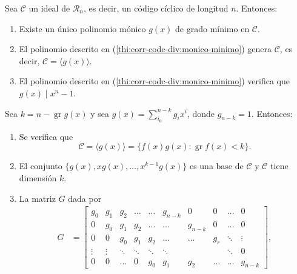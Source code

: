 \begin{theorem}
  \label{th:corr-cod-div}
  Sea \(\mathcal C\) un ideal de \(\mathcal R_n\), es decir, un código cíclico de longitud \(n\). Entonces:
  \begin{enumerate}
    \item Existe un único polinomio mónico \(g(x)\) de grado mínimo en \(\mathcal C\).\label{thi:corr-codc-div:monico-minimo}
    \item El polinomio descrito en (\ref{thi:corr-codc-div:monico-minimo}) genera \(\mathcal C\), es decir, \(\mathcal C = \langle g(x)\rangle\).
    \item El polinomio descrito en (\ref{thi:corr-codc-div:monico-minimo}) verifica que \(g(x) \mid x^n -1\).\label{thi:corr-codc-div:div-xn-1}
  \end{enumerate}
  Sea \(k = n - \operatorname{gr} g(x)\) y sea \(g(x) = \sum_{i_0}^{n-k}g_ix^{i}\), donde \(g_{n-k} = 1\). Entonces:
  \begin{enumerate}[resume]
    \item \label{thi:corr-codc-div:dim-ideal} Se verifica que \[
      \mathcal C = \langle g(x) \rangle = \{f(x)g(x) : \operatorname{gr} f(x) < k\}.
    \]
    \item El conjunto \(\{g(x), xg(x), \dots, x^{k-1}g(x)\}\) es una base de \(\mathcal C\) y \(\mathcal C\) tiene dimensión \(k\).
    \item \label{thi:corr-cod-div:mat-gen} La matriz \(G\) dada por \begin{align*}
      G &= \begin{bmatrix}
        g_0 & g_1 & g_2 & \dots & \dots & g_{n-k} & 0 & 0 & \dots & 0 \\
        0 & g_0 & g_1 & g_2 & \dots & \dots & g_{n-k} & 0 & \dots & 0 \\
        0 & 0 & g_0 & g_1 & g_2 & \dots & \dots & g_r & \ddots & \vdots \\
        \vdots & \vdots & \ddots & \ddots & \ddots & \ddots & & & \ddots & 0\\
        0 & 0 & \dots & 0 & g_0 & g_1 & g_2 & \dots & \dots & g_{n-k} 
      \end{bmatrix},

\end{align*}
\end{enumerate}
\end{theorem}
